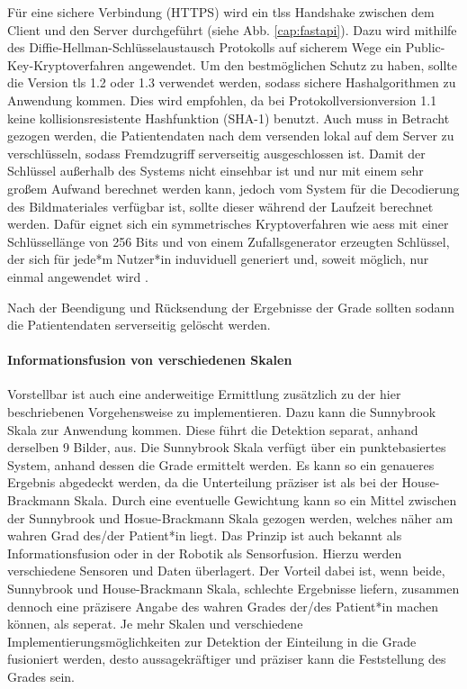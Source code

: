 Für eine sichere Verbindung (HTTPS) wird ein \Acp{tls} Handshake zwischen dem Client und den Server durchgeführt (siehe Abb. \ref{cap:fastapi}). Dazu wird mithilfe des Diffie-Hellman-Schlüsselaustausch Protokolls auf sicherem Wege ein Public-Key-Kryptoverfahren angewendet. Um den bestmöglichen Schutz zu haben, sollte die Version \ac{tls} 1.2 oder 1.3 verwendet werden, sodass sichere Hashalgorithmen zu Anwendung kommen. Dies wird empfohlen, da bei Protokollversionversion 1.1 keine kollisionsresistente Hashfunktion (SHA-1) benutzt. Auch muss in Betracht gezogen werden, die Patientendaten nach dem versenden lokal auf dem Server zu verschlüsseln, sodass Fremdzugriff serverseitig ausgeschlossen ist. Damit der Schlüssel außerhalb des Systems nicht einsehbar ist und nur mit einem sehr großem Aufwand berechnet werden kann, jedoch vom System für die Decodierung des Bildmateriales verfügbar ist, sollte dieser während der Laufzeit berechnet werden. Dafür eignet sich ein symmetrisches Kryptoverfahren wie \Acp{aes} mit einer Schlüssellänge von 256 Bits und von einem Zufallsgenerator erzeugten Schlüssel, der sich für jede*m Nutzer*in induviduell generiert und, soweit möglich, nur einmal angewendet wird \cite{bsi}.

Nach der Beendigung und Rücksendung der Ergebnisse der Grade sollten sodann die Patientendaten serverseitig gelöscht werden.

\paragraph{Informationsfusion von verschiedenen Skalen}
Vorstellbar ist auch eine anderweitige Ermittlung zusätzlich zu der hier beschriebenen Vorgehensweise zu implementieren. Dazu kann die Sunnybrook Skala zur Anwendung kommen. Diese führt die Detektion separat, anhand derselben 9 Bilder, aus. Die Sunnybrook Skala verfügt über ein punktebasiertes System, anhand dessen die Grade ermittelt werden. Es kann so ein genaueres Ergebnis abgedeckt werden, da die Unterteilung präziser ist als bei der House-Brackmann Skala. Durch eine eventuelle Gewichtung kann so ein Mittel zwischen der Sunnybrook und Hosue-Brackmann Skala gezogen werden, welches näher am wahren Grad des/der Patient*in liegt. Das Prinzip ist auch bekannt als Informationsfusion oder in der Robotik als Sensorfusion. Hierzu werden verschiedene Sensoren und Daten überlagert. Der Vorteil dabei ist, wenn beide, Sunnybrook und House-Brackmann Skala, schlechte Ergebnisse liefern, zusammen dennoch eine präzisere Angabe des wahren Grades der/des Patient*in machen können, als seperat. Je mehr Skalen und verschiedene Implementierungsmöglichkeiten zur Detektion der Einteilung in die Grade fusioniert werden, desto aussagekräftiger und präziser kann die Feststellung des Grades sein.

